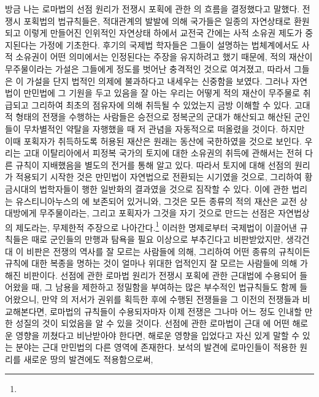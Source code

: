 방금 나는 로마법의 선점 원리가
전쟁시 포획에 관한 의 흐름을 결정했다고 말했다.
전쟁시 포획법의 법규칙들은,
적대관계의 발발에 의해 국가들은 일종의 자연상태로 환원되고
이렇게 만들어진 인위적인 자연상태 하에서
교전국 간에는
사적 소유권 제도가
중지된다는
가정에 기초한다.
후기의 국제법 학자들은
그들이 설명하는 법체계에서도
사적 소유권이 어떤 의미에서는 인정된다는 주장을
유지하려고 했기 때문에,
적의 재산이 무주물이라는 가설은 그들에게
정도를 벗어난 충격적인 것으로 여겨졌고,
따라서 그들은 이 가설을 단지 법적인 의제에 불과하다고
내세우는 신중함을 보였다.
그러나 자연법이 만민법에 그 기원을 두고 있음을 잘 아는 우리는
어떻게 적의 재산이 무주물로 취급되고 그리하여
최초의 점유자에 의해 취득될 수 있었는지 금방 이해할 수 있다.
고대적 형태의 전쟁을 수행하는 사람들은
승전으로 정복군의 군대가 해산되고
해산된 군인들이 무차별적인 약탈을 자행했을 때
저 관념을 자동적으로 떠올렸을 것이다.
하지만
이때 포획자가 취득하도록 허용된 재산은
원래는 동산에 국한하였을 것으로 보인다.
우리는
고대 이탈리아에서
피정복 국가의 토지에 대한 소유권의 취득에 관해서는
전혀 다른 규칙이 지배했음을 별도의 전거를 통해 알고 있다.
따라서 토지에 대해 선점의 원리가 적용되기 시작한 것은
만민법이 자연법으로 전환되는 시기였을 것으로,
그리하여 황금시대의 법학자들이 행한 일반화의 결과였을 것으로
짐작할 수 있다.
이에 관한 법리는 유스티니아누스의 에 보존되어 있거니와,
그것은 모든 종류의 적의 재산은 교전 상대방에게 무주물이라는,
그리고 포획자가 그것을 자기 것으로 만드는 선점은 자연법상의 제도라는,
무제한적 주장으로 나아간다.\footnote{%
  }
이러한 명제로부터 국제법이 이끌어낸 규칙들은
때로 군인들의 만행과 탐욕을 필요 이상으로 부추긴다고
비판받았지만,
생각건대 이 비판은
전쟁의 역사를 잘 모르는 사람들에 의해,
그리하여 어떤 종류의 규칙이든 규칙에 대한 복종을 명하는 것이
얼마나 위대한 업적인지 잘 모르는 사람들에 의해 가해진 비판이다.
선점에 관한 로마법 원리가 전쟁시 포획에 관한 근대법에 수용되어 들어왔을 때,
그 남용을 제한하고 정밀함을 부여하는
많은 부수적인 법규칙들도 함께 들어왔으니,
만약 의 저서가 권위를 획득한 후에 수행된 전쟁들을
그 이전의 전쟁들과 비교해본다면,
로마법의 규칙들이 수용되자마자 이제 전쟁은 그나마 어느 정도
인내할 만한 성질의 것이 되었음을 알 수 있을 것이다.
선점에 관한 로마법이 근대 에
어떤 해로운 영향을 끼쳤다고 비난받아야 한다면,
해로운 영향을 입었다고 자신 있게 말할 수 있는
분야는
근대 만민법의 다른 영역에 존재한다.
보석의 발견에 로마인들이 적용한 원리를 새로운 땅의 발견에도 적용함으로써,
